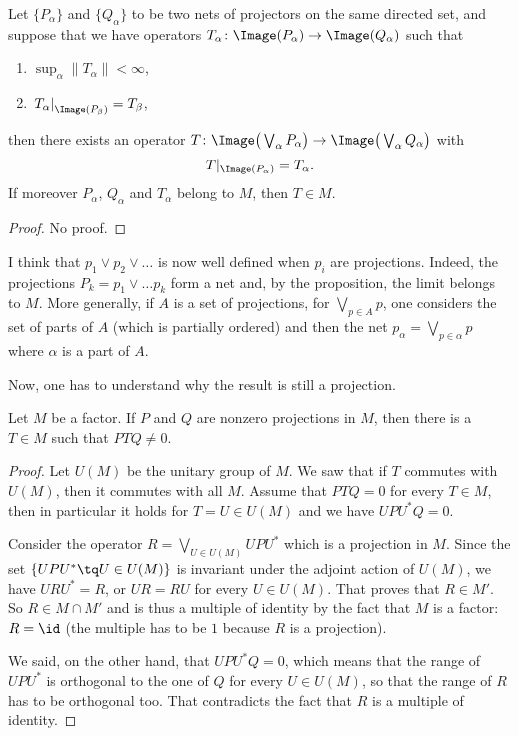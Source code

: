 \begin{proposition}
	Let $\{ P_{\alpha} \}$ and $\{ Q_{\alpha} \}$ to be two nets of projectors on the same directed set, and suppose that we have operators $T_{\alpha}\colon \Image(P_{\alpha})\to \Image(Q_{\alpha})$ such that
	\begin{enumerate}
		\item $\sup_{\alpha}\| T_{\alpha} \|<\infty$,
		\item $\left.T_{\alpha}\right|_{\Image(P_{\beta})}=T_{\beta}$,
	\end{enumerate}
	then there exists an operator $T\colon \Image\big(\bigvee_{\alpha} P_{\alpha}\big)\to \Image\big(\bigvee_{\alpha}Q_{\alpha}\big)$  with
	\[
		T|_{\Image(P_{\alpha})}=T_{\alpha}.
	\]
	If moreover $P_{\alpha}$, $Q_{\alpha}$ and $T_{\alpha}$ belong to $M$, then $T\in M$.
\end{proposition}

\begin{proof}
	No proof.
\end{proof}

\begin{probleme}
	I think that $p_1\vee p_2\vee \ldots$ is now well defined when $p_i$ are projections. Indeed, the projections $P_k=p_1\vee \ldots p_k$ form a net and, by the proposition, the limit belongs to $M$. More generally, if $A$ is a set of projections, for $\bigvee_{p\in A}p$, one considers the set of parts of $A$ (which is partially ordered) and then the net $p_{\alpha}=\bigvee_{p\in\alpha}p$ where $\alpha$ is a part of $A$.

	Now, one has to understand why the result is still a projection.
\end{probleme}


\begin{lemma}		\label{LemPTQnnzero}
	Let $M$ be a factor. If $P$ and $Q$ are nonzero projections in $M$, then there is a $T\in M$ such that $PTQ\neq 0$.
\end{lemma}

\begin{proof}
	Let $U(M)$ be the unitary group of $M$. We saw that if $T$ commutes with $U(M)$, then it commutes with all $M$. Assume that $PTQ=0$ for every $T\in M$, then in particular it holds for $T=U\in U(M)$ and we have $UPU^*Q=0$.

	Consider the operator $R=\bigvee_{U\in U(M)}UPU^*$ which is a projection in $M$. Since the set $\{ UPU^*\tq U\in U(M) \}$ is invariant under the adjoint action of $U(M)$, we have $URU^*=R$, or $UR=RU$ for every $U\in U(M)$. That proves that $R\in M'$. So $R\in M\cap M'$ and is thus a multiple of identity by the fact that $M$ is a factor: $R=\id$ (the multiple has to be $1$ because $R$ is a projection).

	We said, on the other hand, that $UPU^*Q=0$, which means that the range of $UPU^*$ is orthogonal to the one of $Q$ for every $U\in U(M)$, so that the range of $R$ has to be orthogonal too. That contradicts the fact that $R$ is a multiple of identity.
\end{proof}

